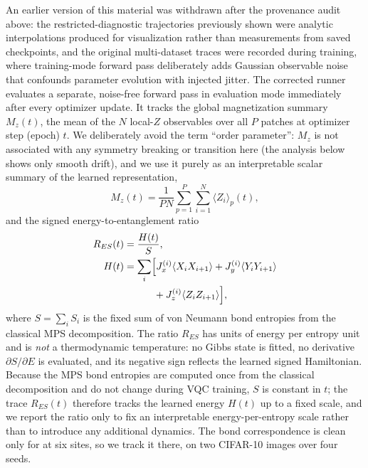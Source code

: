 \documentclass[11pt]{article}
\DeclareRobustCommand{\blue}[1]{\leavevmode{\color{blue}#1}}
\begin{document}
An earlier version of this material was withdrawn after the provenance audit above: the restricted-diagnostic trajectories previously shown were analytic interpolations produced for visualization rather than measurements from saved checkpoints, and the original multi-dataset traces were recorded during training, where \blue{PCAE2D's} training-mode forward pass deliberately adds Gaussian observable noise that confounds parameter evolution with injected jitter. The corrected runner evaluates a separate, noise-free forward pass in evaluation mode immediately after every optimizer update. It tracks the global magnetization summary $M_z(t)$, the mean of the $N$ local-$Z$ observables over all $P$ patches at optimizer step (epoch) $t$. We deliberately avoid the term ``order parameter'': $M_z$ is not associated with any symmetry breaking or transition here (the analysis below shows only smooth drift), and we use it purely as an interpretable scalar summary of the learned representation,
\begin{equation}
M_z(t) = \frac{1}{P N}\sum_{p=1}^{P}\sum_{i=1}^{N}\langle Z_i\rangle_p(t),
\label{eq:order_parameter}
\end{equation}
and the signed energy-to-entanglement ratio
\begin{align}
R_{ES}(t)&=\frac{H(t)}{S},\\
H(t)&=\sum_i\Bigl[J_x^{(i)}\langle X_iX_{i+1}\rangle
+J_y^{(i)}\langle Y_iY_{i+1}\rangle \nonumber\\
&\hspace{3.0em}+J_z^{(i)}\langle Z_iZ_{i+1}\rangle\Bigr],
\end{align}
where $S=\sum_i S_i$ is the fixed sum of von Neumann bond entropies from the classical MPS decomposition. The ratio $R_{ES}$ has units of energy per entropy unit and is \emph{not} a thermodynamic temperature: no Gibbs state is fitted, no derivative $\partial S/\partial E$ is evaluated, and its negative sign reflects the learned signed Hamiltonian. Because the MPS bond entropies are computed once from the classical decomposition and do not change during VQC training, $S$ is constant in $t$; the trace $R_{ES}(t)$ therefore tracks the learned energy $H(t)$ up to a fixed scale, and we report the ratio only to fix an interpretable energy-per-entropy scale rather than to introduce any additional dynamics. The bond correspondence is clean only for \blue{PCAE1D} at six sites, so we track it there, on two CIFAR-10 images over four seeds.
\end{document}
